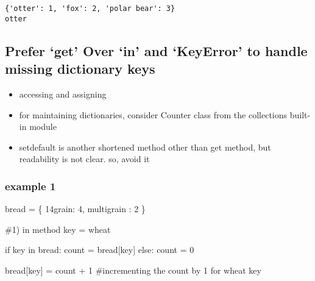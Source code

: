 \documentclass[
]{report}
\newenvironment{Shaded}{\begin{snugshade}}{\end{snugshade}}
\newcommand{\CommentTok}[1]{\textcolor[rgb]{0.37,0.37,0.37}{#1}}
\newcommand{\ControlFlowTok}[1]{\textcolor[rgb]{0.00,0.23,0.31}{#1}}
\newcommand{\DecValTok}[1]{\textcolor[rgb]{0.68,0.00,0.00}{#1}}
\newcommand{\KeywordTok}[1]{\textcolor[rgb]{0.00,0.23,0.31}{#1}}
\newcommand{\NormalTok}[1]{\textcolor[rgb]{0.00,0.23,0.31}{#1}}
\newcommand{\OperatorTok}[1]{\textcolor[rgb]{0.37,0.37,0.37}{#1}}
\newcommand{\StringTok}[1]{\textcolor[rgb]{0.13,0.47,0.30}{#1}}
\providecommand{\tightlist}{%
  \setlength{\itemsep}{0pt}\setlength{\parskip}{0pt}}\usepackage{longtable,booktabs,array}
\begin{document}
\begin{verbatim}
{'otter': 1, 'fox': 2, 'polar bear': 3}
otter
\end{verbatim}

\hypertarget{prefer-get-over-in-and-keyerror-to-handle-missing-dictionary-keys}{%
\subsection{Prefer `get' Over `in' and `KeyError' to handle missing
dictionary
keys}\label{prefer-get-over-in-and-keyerror-to-handle-missing-dictionary-keys}}

\begin{itemize}
\tightlist
\item
  accessing and assigning
\item
  for maintaining dictionaries, consider Counter class from the
  collections built-in module
\item
  setdefault is another shortened method other than get method, but
  readability is not clear. so, avoid it
\end{itemize}

\hypertarget{example-1}{%
\subsubsection{example 1}\label{example-1}}

\begin{Shaded}
\begin{Highlighting}[]
\NormalTok{bread }\OperatorTok{=}\NormalTok{ \{}
    \StringTok{\textquotesingle{}14grain\textquotesingle{}}\NormalTok{: }\DecValTok{4}\NormalTok{,}
    \StringTok{\textquotesingle{}multigrain\textquotesingle{}}\NormalTok{ : }\DecValTok{2}
\NormalTok{\}}

\CommentTok{\#1) \textquotesingle{}in\textquotesingle{} method}
\NormalTok{key }\OperatorTok{=} \StringTok{\textquotesingle{}wheat\textquotesingle{}}

\ControlFlowTok{if}\NormalTok{ key }\KeywordTok{in}\NormalTok{ bread:}
\NormalTok{    count }\OperatorTok{=}\NormalTok{ bread[key]}
\ControlFlowTok{else}\NormalTok{:}
\NormalTok{    count }\OperatorTok{=} \DecValTok{0}

\NormalTok{bread[key] }\OperatorTok{=}\NormalTok{ count }\OperatorTok{+} \DecValTok{1}  \CommentTok{\#incrementing the count by 1 for \textquotesingle{}wheat\textquotesingle{} key}
\end{Highlighting}
\end{Shaded}
\end{document}
